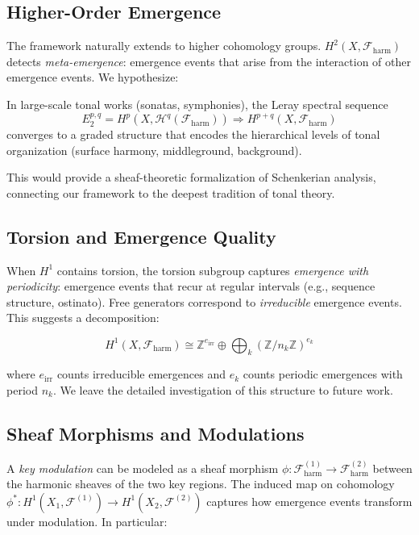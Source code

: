 \documentclass[12pt,a4paper]{article}
\newcommand{\ZZ}{\mathbb{Z}}
\newcommand{\Hone}{H^{1}}
\newcommand{\Htwo}{H^{2}}
\newcommand{\sheaf}{\mathscr{F}}
\begin{document}
\subsection{Higher-Order Emergence}

The framework naturally extends to higher cohomology groups. $\Htwo(X, \sheaf_{\mathrm{harm}})$ 
detects \emph{meta-emergence}: emergence events that arise from the interaction of other 
emergence events. We hypothesize:

\begin{conjecture}
  In large-scale tonal works (sonatas, symphonies), the Leray spectral sequence
  \[
    E_2^{p,q} = H^p(X, \mathcal{H}^q(\sheaf_{\mathrm{harm}})) 
    \Longrightarrow H^{p+q}(X, \sheaf_{\mathrm{harm}})
  \]
  converges to a graded structure that encodes the hierarchical levels of tonal organization 
  (surface harmony, middleground, background).
\end{conjecture}

This would provide a sheaf-theoretic formalization of Schenkerian analysis, connecting 
our framework to the deepest tradition of tonal theory.

\subsection{Torsion and Emergence Quality}

When $\Hone$ contains torsion, the torsion subgroup captures \emph{emergence with periodicity}:
emergence events that recur at regular intervals (e.g., sequence structure, ostinato). 
Free generators correspond to \emph{irreducible} emergence events. This suggests a 
decomposition:

\[
  \Hone(X, \sheaf_{\mathrm{harm}}) \cong \ZZ^{e_{\mathrm{irr}}} \oplus 
  \bigoplus_{k} (\ZZ / n_k\ZZ)^{e_k}
\]

where $e_{\mathrm{irr}}$ counts irreducible emergences and $e_k$ counts periodic emergences 
with period $n_k$. We leave the detailed investigation of this structure to future work.

\subsection{Sheaf Morphisms and Modulations}

A \emph{key modulation} can be modeled as a sheaf morphism $\phi\colon \sheaf_{\mathrm{harm}}^{(1)} 
\to \sheaf_{\mathrm{harm}}^{(2)}$ between the harmonic sheaves of the two key regions. 
The induced map on cohomology $\phi^*\colon \Hone(X_1, \sheaf^{(1)}) \to \Hone(X_2, \sheaf^{(2)})$ 
captures how emergence events transform under modulation. In particular:
\end{document}
